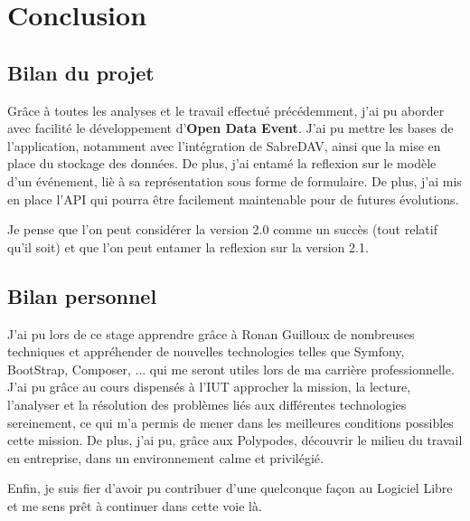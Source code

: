 \section*{Conclusion}

\subsection*{Bilan du projet}

Grâce à toutes les analyses et le travail effectué précédemment, j'ai pu aborder avec facilité le développement d'\textbf{Open Data Event}. J'ai pu mettre les bases de l'application, notamment avec l'intégration de SabreDAV, ainsi que la mise en place du stockage des données. De plus, j'ai entamé la reflexion sur le modèle d'un événement, liè à sa représentation sous forme de formulaire. De plus, j'ai mis en place l'API qui pourra être facilement maintenable pour de futures évolutions.

Je pense que l'on peut considérer la version 2.0 comme un succès (tout relatif qu'il soit) et que l'on peut entamer la reflexion sur la version 2.1.

\subsection*{Bilan personnel}

J'ai pu lors de ce stage apprendre grâce à Ronan Guilloux de nombreuses techniques et appréhender de nouvelles technologies telles que Symfony, BootStrap, Composer, ... qui me seront utiles lors de ma carrière professionnelle. J'ai pu grâce au cours dispensés à l'IUT approcher la mission, la lecture, l'analyser et la résolution des problèmes liés aux différentes technologies sereinement, ce qui m'a permis de mener dans les meilleures conditions possibles cette mission. De plus, j'ai pu, grâce aux Polypodes, découvrir le milieu du travail en entreprise, dans un environnement calme et privilégié. 

Enfin, je suis fier d'avoir pu contribuer d'une quelconque façon au Logiciel Libre et me sens prêt à continuer dans cette voie là.